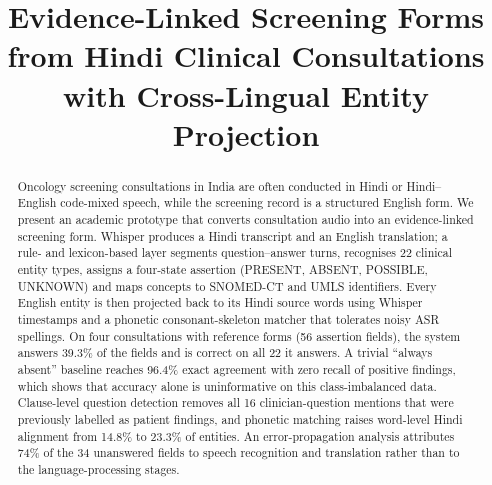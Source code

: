 \documentclass[conference]{IEEEtran}
\begin{document}
\title{Evidence-Linked Screening Forms from Hindi Clinical Consultations with Cross-Lingual Entity Projection}

\author{
\and
{}
\and
{}
\and
{}
\and
{}
}

\maketitle

\begin{abstract}
Oncology screening consultations in India are often conducted in Hindi or Hindi–English code-mixed speech, while the screening record is a structured English form. We present an academic prototype that converts consultation audio into an evidence-linked screening form. Whisper produces a Hindi transcript and an English translation; a rule- and lexicon-based layer segments question–answer turns, recognises 22 clinical entity types, assigns a four-state assertion (PRESENT, ABSENT, POSSIBLE, UNKNOWN) and maps concepts to SNOMED-CT and UMLS identifiers. Every English entity is then projected back to its Hindi source words using Whisper timestamps and a phonetic consonant-skeleton matcher that tolerates noisy ASR spellings. On four consultations with reference forms (56 assertion fields), the system answers 39.3\% of the fields and is correct on all 22 it answers. A trivial “always absent” baseline reaches 96.4\% exact agreement with zero recall of positive findings, which shows that accuracy alone is uninformative on this class-imbalanced data. Clause-level question detection removes all 16 clinician-question mentions that were previously labelled as patient findings, and phonetic matching raises word-level Hindi alignment from 14.8\% to 23.3\% of entities. An error-propagation analysis attributes 74\% of the 34 unanswered fields to speech recognition and translation rather than to the language-processing stages.
\end{abstract}
\end{document}
